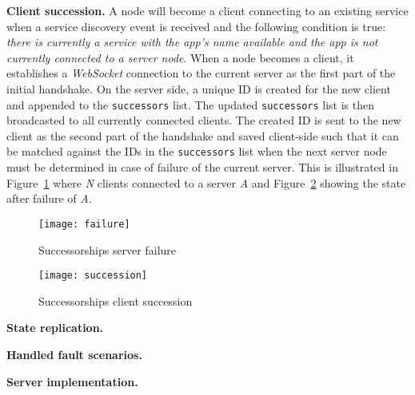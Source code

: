 \noindent\textbf{Client succession.}
A \APIshort node will become a client connecting to an existing service when a service discovery event is received and the following condition is true: \textit{there is currently a \APIshort service with the app's name available and the app is not currently connected to a server node}. When a node becomes a client, it establishes a \textit{WebSocket} connection to the current server as the first part of the initial handshake. On the server side, a unique ID is created for the new client and appended to the \texttt{successors} list. The updated \texttt{successors} list is then broadcasted to all currently connected clients. The created ID is sent to the new client as the second part of the handshake and saved client-side such that it can be matched against the IDs in the \texttt{successors} list when the next server node must be determined in case of failure of the current server. This is illustrated in Figure~\ref{fig:failure} where \textit{N} clients connected to a server \textit{A} and Figure~\ref{fig:succession} showing the state after failure of \textit{A}.

\begin{figure}[h]
    \centering
    \texttt{[image: failure]}
    \caption{Successorships server failure}
    \label{fig:failure}
\end{figure}

\begin{figure}[h]
    \centering
    \texttt{[image: succession]}
    \caption{Successorships client succession}
    \label{fig:succession}
\end{figure}

\noindent\textbf{State replication.}

\noindent\textbf{Handled fault scenarios.}

\noindent\textbf{Server implementation.}


